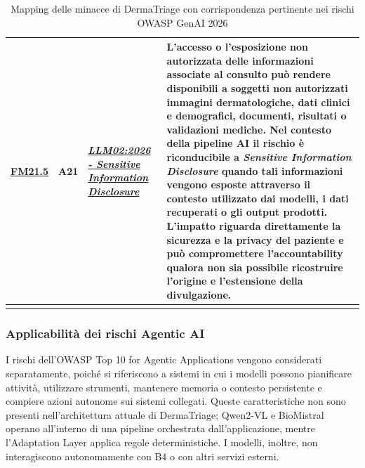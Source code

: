 {\begin{xltabular}{\textwidth}{
    >{\raggedright\arraybackslash}p{1.1cm}
    >{\raggedright\arraybackslash}p{1.1cm}
    >{\raggedright\arraybackslash}p{4.3cm}
    X
}
\midrule


\hyperlink{fm21-5}{FM21.5} &

A21 &

\href{https://genai.owasp.org/resource/owasp-genai-llm-top-10-2026/}
{\textit{LLM02:2026 - Sensitive Information Disclosure}} &

L'accesso o l'esposizione non autorizzata delle informazioni associate
al consulto può rendere disponibili a soggetti non autorizzati immagini
dermatologiche, dati clinici e demografici, documenti, risultati o
validazioni mediche. Nel contesto della pipeline AI il rischio è
riconducibile a \textit{Sensitive Information Disclosure} quando tali
informazioni vengono esposte attraverso il contesto utilizzato dai
modelli, i dati recuperati o gli output prodotti. L'impatto riguarda
direttamente la sicurezza e la privacy del paziente e può compromettere
l'accountability qualora non sia possibile ricostruire l'origine e
l'estensione della divulgazione. \\

\bottomrule

\caption{Mapping delle minacce di DermaTriage con corrispondenza pertinente
nei rischi OWASP GenAI 2026}

\label{tab:owasp-ai-mapping}\\

\end{xltabular}
}

\subsubsection{Applicabilità dei rischi Agentic AI}

I rischi dell'OWASP Top 10 for Agentic Applications vengono considerati separatamente, poiché si riferiscono a sistemi in cui i modelli possono pianificare attività, utilizzare strumenti, mantenere memoria o contesto persistente e compiere azioni autonome sui sistemi collegati. Queste caratteristiche non sono presenti nell'architettura attuale di DermaTriage; Qwen2-VL e BioMistral operano all'interno di una pipeline orchestrata dall'applicazione, mentre l'Adaptation Layer applica regole deterministiche. I modelli, inoltre, non interagiscono autonomamente con B4 o con altri servizi esterni.

